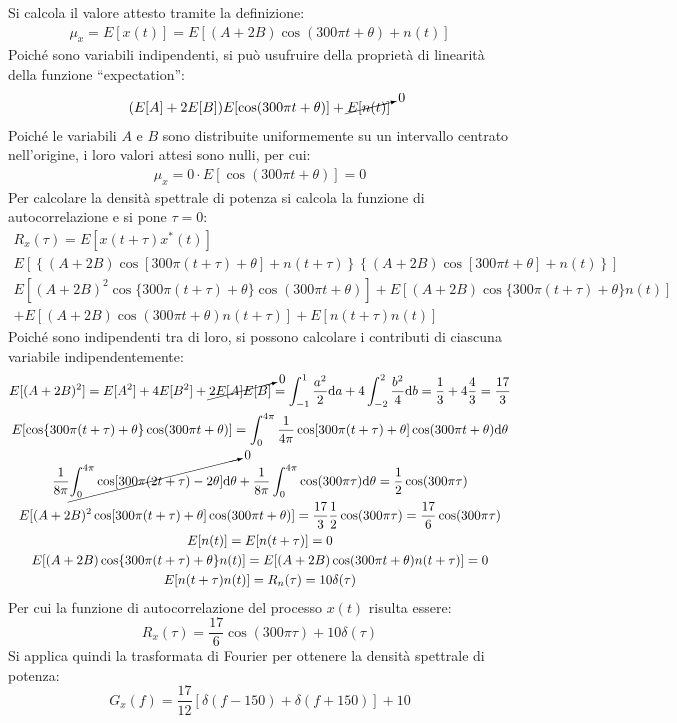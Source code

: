 \documentclass{article}
\newcommand{\df}{\mathrm{d}}
\begin{document}
Si calcola il valore attesto tramite la definizione:
\begin{gather*}
    \mu_x=E[x(t)]=E[(A+2B)\cos(300\pi t+\theta)+n(t)]
\end{gather*}
Poiché sono variabili indipendenti, si può usufruire della proprietà di linearità della funzione ``expectation'':
\begin{gather*}
    (E[A]+2E[B])E[\cos(300\pi t+\theta)]+\cancelto{0}{E[n(t)]}
\end{gather*}
Poiché le variabili $A$ e $B$ sono distribuite uniformemente su un intervallo centrato nell'origine, i loro valori attesi sono nulli, per cui:
\begin{gather*}
    \mu_x=0\cdot E[\cos(300\pi t+\theta)]=0
\end{gather*}
Per calcolare la densità spettrale di potenza si calcola la funzione di autocorrelazione e si pone $\tau=0$:
\begin{gather*}
    R_x(\tau)=E[x(t+\tau)x^*(t)]\\
    E\left[\left\{(A+2B)\cos[300\pi (t+\tau)+\theta]+n(t+\tau)\right\}\left\{(A+2B)\cos[300\pi t+\theta]+n(t)\right\}\right]\\
    E[(A+2B)^2\cos\{300\pi(t+\tau)+\theta\}\cos(300\pi t+\theta)]+E[(A+2B)\cos\{300\pi (t+\tau)+\theta\}n(t)]\\
    +E[(A+2B)\cos(300\pi t+\theta)n(t+\tau)]+E[n(t+\tau)n(t)]
\end{gather*}
Poiché sono indipendenti tra di loro, si possono calcolare i contributi di ciascuna variabile indipendentemente:
\begin{gather*}
    E[(A+2B)^2]=E[A^2]+4E[B^2]+\cancelto{0}{2E[A]E[B]}=\displaystyle\int_{-1}^1\frac{a^2}{2}\df a+4\int_{-2}^{2}\frac{b^2}{4}\df b=\frac{1}{3}+4\frac{4}{3}=\frac{17}{3}\\
    E[\cos\{300\pi(t+\tau)+\theta\}\cos(300\pi t+\theta)]=\displaystyle\int_{0}^{4\pi}\frac{1}{4\pi}\cos[300\pi(t+\tau)+\theta]\cos(300\pi t+\theta)\df\theta\\
    \displaystyle\frac{1}{8\pi}\cancelto{0}{\int_{0}^{4\pi}\cos[300\pi(2t+\tau)-2\theta]\df\theta}+\frac{1}{8\pi}\int_0^{4\pi}\cos(300\pi \tau)\df\theta=\frac{1}{2}\cos(300\pi\tau)\\
    E[(A+2B)^2\cos[300\pi(t+\tau)+\theta]\cos(300\pi t+\theta)]=\displaystyle\frac{17}{3}\frac{1}{2}\cos(300\pi\tau)=\frac{17}{6}\cos(300\pi\tau)\\
    E[n(t)]=E[n(t+\tau)]=0\\
    E[(A+2B)\cos\{300\pi (t+\tau)+\theta\}n(t)]=E[(A+2B)\cos(300\pi t+\theta)n(t+\tau)]=0\\
    E[n(t+\tau)n(t)]=R_n(\tau)=10\delta(\tau)\\
\end{gather*}
Per cui la funzione di autocorrelazione del processo $x(t)$ risulta essere:
\begin{equation*}
    R_x(\tau)=\displaystyle\frac{17}{6}\cos(300\pi\tau)+10\delta(\tau)
\end{equation*}
Si applica quindi la trasformata di Fourier per ottenere la densità spettrale di potenza:
\begin{equation}
    G_x(f)=\displaystyle\frac{17}{12}\left[\delta(f-150)+\delta(f+150)\right]+10
\end{equation}
\end{document}
